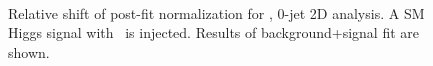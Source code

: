 \begin{figure}[!hbtp]
{}
\\
\caption{Relative shift of post-fit normalization for  \GeV, 0-jet 2D analysis.
A SM Higgs signal with  \GeV\ is injected. Results of background+signal fit are shown.}
\label{fig:norm_inj200_0j_125_sfit}
\end{figure}

